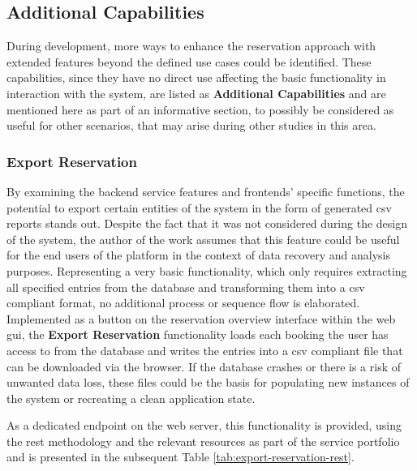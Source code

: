 \newpage

\subsection{Additional Capabilities}
\label{ch:Implementation:sec:Reservation System:ssec:Additional Capabilities}

During development, more ways to enhance the reservation approach with extended features beyond the defined use cases could be identified.
These capabilities, since they have no direct use affecting the basic functionality in interaction with the system, are listed as \textbf{Additional Capabilities} and are mentioned here as part of an informative section, to possibly be considered as useful for other scenarios, that may arise during other studies in this area.

\subsubsection{Export Reservation}
\label{ch:Implementation:sec:Reservation System:ssec:Additional Capabilities:sssec:Export Reservation}

By examining the backend service features and frontends' specific functions, the potential to export certain entities of the system in the form of generated \acrshort{csv} reports stands out.
Despite the fact that it was not considered during the design of the system, the author of the work assumes that this feature could be useful for the end users of the platform in the context of data recovery and analysis purposes.
Representing a very basic functionality, which only requires extracting all specified entries from the database and transforming them into a \acrshort{csv} compliant format, no additional process or sequence flow is elaborated.
Implemented as a button on the reservation overview interface within the web \acrshort{gui}, the \textbf{Export Reservation} functionality loads each booking the user has access to from the database and writes the entries into a \acrshort{csv} compliant file that can be downloaded via the browser.
If the database crashes or there is a risk of unwanted data loss, these files could be the basis for populating new instances of the system or recreating a clean application state.

\noindent As a dedicated endpoint on the web server, this functionality is provided, using the \acrshort{rest} methodology and the relevant resources as part of the service portfolio and is presented in the subsequent Table \ref{tab:export-reservation-rest}.

